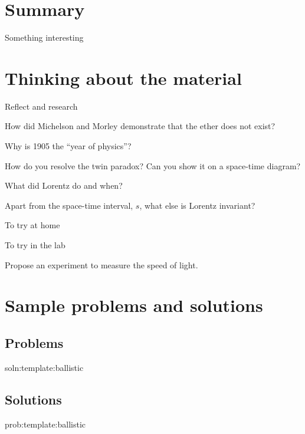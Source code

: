 \newpage
\section{Summary}
\vspace{2cm}
\begin{chapterSummary}
\item Something interesting
\end{chapterSummary}


\newpage
\section{Thinking about the material}

\begin{chapteractivity}{Reflect and research}
	{
	\item How did Michelson and Morley demonstrate that the ether does not exist? 
	\item Why is 1905 the ``year of physics''?
	\item How do you resolve the twin paradox? Can you show it on a space-time diagram?
	\item What did Lorentz do and when?
	\item Apart from the space-time interval, $s$, what else is Lorentz invariant?
	}
\end{chapteractivity}

\begin{chapteractivity}{To try at home}
	{
		\item 
	}
\end{chapteractivity}

\begin{chapteractivity}{To try in the lab}
	{
		\item Propose an experiment to measure the speed of light.
	}
\end{chapteractivity}

\newpage
\section{Sample problems and solutions}
\subsection{Problems}

\begin{problem}{soln:template:ballistic}{\label{prob:template:ballistic} 

}
\end{problem}

\newpage
\subsection{Solutions}
\begin{solution}{prob:template:ballistic}\label{soln:template:ballistic}

\end{solution}
